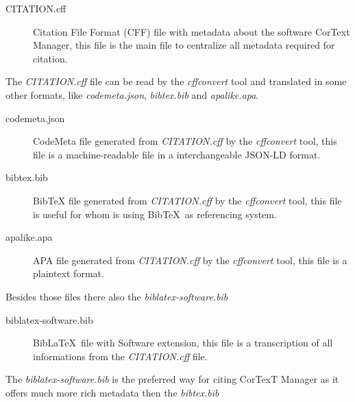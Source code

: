 \documentclass{article}
\begin{document}
\begin{description}
  \item[CITATION.cff] Citation File Format (CFF) file with metadata about the software CorText Manager,
    this file is the main file to centralize all metadata required for citation.
\end{description}

The {\em CITATION.cff} file can be read by the {\em cffconvert} tool and
translated in some other formats, like {\em codemeta.json}, {\em bibtex.bib}
and {\em apalike.apa}.

\begin{description}
  \item[codemeta.json] CodeMeta file generated from {\em CITATION.cff} by the
    {\em cffconvert} tool, this file is a machine-readable file in a
    interchangeable JSON-LD format.
  \item[bibtex.bib] BibTeX file generated from {\em CITATION.cff} by the {\em
    cffconvert} tool, this file is useful for whom is using Bib\TeX \ as referencing
    system.
  \item[apalike.apa] APA file generated from {\em CITATION.cff} by the {\em
    cffconvert} tool, this file is a plaintext format.
\end{description}


Besides those files there also the {\em biblatex-software.bib}


\begin{description}
  \item[biblatex-software.bib] Bib\LaTeX \ file with Software extension,
    this file is a transcription of all informations from the {\em CITATION.cff} file.
\end{description}

The {\em biblatex-software.bib} is the preferred way for citing CorTexT Manager
as it offers much more rich metadata then the {\em bibtex.bib}

\printbibliography
\end{document}
